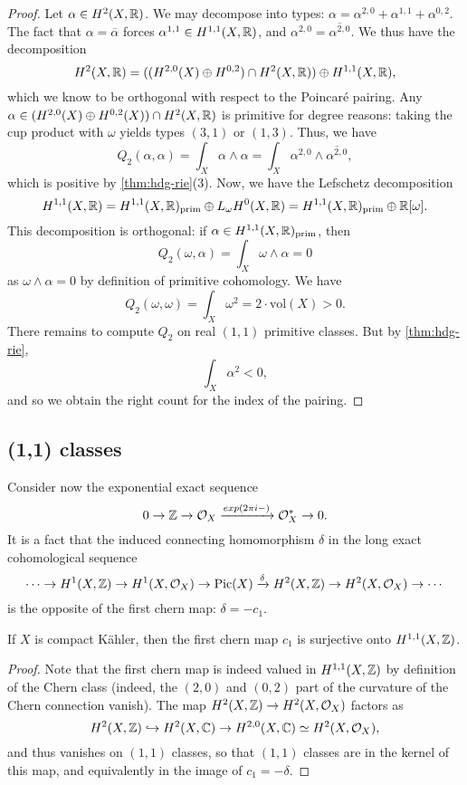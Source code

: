 \begin{proof}
Let $\alpha\in H^2(X,\mathbb R)$. We may decompose into types: $\alpha=\alpha^{2,0}+\alpha^{1,1}+\alpha^{0,2}$. The fact that $\alpha=\overline \alpha$ forces $\alpha^{1,1}\in H^{1,1}(X,\mathbb R)$, and $\alpha^{2,0}=\overline{\alpha^{2,0}}$. 
We thus have the decomposition
\[
H^2(X,\mathbb R)=((H^{2,0}(X)\oplus H^{0,2})\cap H^2(X,\mathbb R))\oplus H^{1,1}(X,\mathbb R),
\]
which we know to be orthogonal with respect to the Poincaré pairing. Any $\alpha\in(H^{2,0}(X)\oplus H^{0,2}(X))\cap H^2(X,\mathbb R)$ is primitive for degree reasons: taking the cup product with $\omega$ yields types $(3,1)$ or $(1,3)$. Thus, we have
\[
Q_2(\alpha,\alpha)=\int_X\alpha\wedge\alpha=\int_X\alpha^{2,0}\wedge\overline{\alpha^{2,0}},
\]
which is positive by \autoref{thm:hdg-rie}(3). Now, we have the Lefschetz decomposition
%
\[
H^{1,1}(X,\mathbb R)=H^{1,1}(X,\mathbb R)_{\text{prim}}\oplus L_\omega H^0(X,\mathbb R)=H^{1,1}(X,\mathbb R)_{\text{prim}}\oplus \mathbb R[\omega].
\]
This decomposition is orthogonal: if $\alpha\in H^{1,1}(X,\mathbb R)_{\text{prim}}$, then
\[
Q_2(\omega,\alpha)=\int_X\omega\wedge\alpha=0
\]
as $\omega\wedge\alpha=0$ by definition of primitive cohomology. We have
%
\[
Q_2(\omega,\omega)=\int_X\omega^2=2\cdot\text{vol}(X)>0.
\]
There remains to compute $Q_2$ on real $(1,1)$ primitive classes. But by \autoref{thm:hdg-rie}, 
\[
\int_X\alpha^2<0,
\]
and so we obtain the right count for the index of the pairing.
\end{proof}
%
\subsection{(1,1) classes}
Consider now the exponential exact sequence
\[
0\to \mathbb Z\to \mathcal{O}_X\xrightarrow{exp(2\pi i-)} \mathcal{O}_X^*\to 0.
\]
It is a fact that the induced connecting homomorphism $\delta$ in the long exact cohomological sequence
\[
\cdots\to H^1(X,\mathbb Z)\to H^1(X,\mathcal{O}_X)\to \text{Pic}(X)\xrightarrow{\delta}H^2(X,\mathbb Z)\to H^2(X,\mathcal{O}_X)\to \cdots
\]	
is the opposite of the first chern map: $\delta=-c_1$.
\begin{theorem}
	If $X$ is compact Kähler, then the first chern map $c_1$ is surjective onto $H^{1,1}(X,\mathbb Z)$.
\end{theorem}
\begin{proof}
	Note that the first chern map is indeed valued in $H^{1,1}(X,\mathbb Z)$ by definition of the Chern class (indeed, the $(2,0)$ and $(0,2)$ part of the curvature of the Chern connection vanish). The map $H^2(X,\mathbb Z)\to H^2(X,\mathcal{O}_X)$ factors as
	\[
	H^2(X,\mathbb Z)\hookrightarrow H^2(X,\mathbb C)\to H^{2,0}(X,\mathbb C)\simeq H^2(X,\mathcal{O}_X),
	\]
	and thus vanishes on $(1,1)$ classes, so that $(1,1)$ classes are in the kernel of this map, and equivalently in the image of $c_1=-\delta$. 
\end{proof}
	
	
	
	
	
	
	
	
	